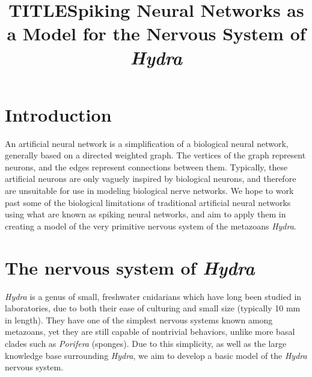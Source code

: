 \documentclass{article}
\date{}
\title{TITLE}
\title{Spiking Neural Networks as a Model for the Nervous System of \textit{Hydra}}
\begin{document}
\maketitle


\section{Introduction}

An artificial neural network is a simplification of a biological neural network, generally based on a directed weighted graph. The vertices of the graph represent neurons, and the edges represent connections between them. Typically, these artificial neurons are only vaguely inspired by biological neurons, and therefore are unsuitable for use in modeling biological nerve networks. We hope to work past some of the biological limitations of traditional artificial neural networks using what are known as spiking neural networks, and aim to apply them in creating a model of the very primitive nervous system of the metazoans \textit{Hydra}.


\section{The nervous system of \textit{Hydra}}
\textit{Hydra} is a genus of small, freshwater cnidarians which have long been studied in laboratories, due to both their ease of culturing and small size (typically 10 mm in length). They have one of the simplest nervous systems known among metazoans, yet they are still capable of nontrivial behaviors, unlike more basal clades such as \textit{Porifera} (sponges). Due to this simplicity, as well as the large knowledge base surrounding \textit{Hydra}, we aim to develop a basic model of the \textit{Hydra} nervous system.
\end{document}
